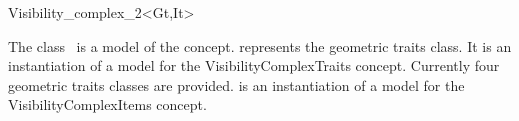 
\ccRefPageBegin

\begin{ccRefClass}{Visibility_complex_2<Gt,It>}

\ccDefinition
  
The class \ccRefName\ is a model of the  concept.
 represents the geometric traits class. It is an instantiation of a
model for the VisibilityComplexTraits
 concept.  Currently four geometric
traits classes are provided.  is an instantiation of a model for the
VisibilityComplexItems  concept.


\ccIsModel


\ccSeeAlso

\\
\\
 \\
 \\
 \\
 \\

\end{ccRefClass} 
